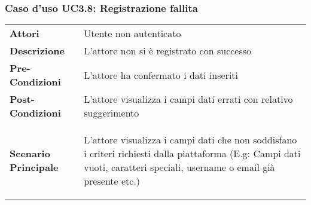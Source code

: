 \subsubsection{Caso d'uso UC3.8:  Registrazione fallita}
\label{UC3_8}

\begin{minipage}{\linewidth}
\begin{longtable}{ l | p{11cm}}
	\hline
	\rowcolor{Gray}
	 \multicolumn{2}{c}{UC3.8 - Registrazione fallita} \\
	 \hline
	\textbf{Attori} & Utente non autenticato \\
	\textbf{Descrizione} & L'attore non si è registrato con successo  \\
	\textbf{Pre-Condizioni} & L'attore ha confermato i dati inseriti \\
	\textbf{Post-Condizioni} & L'attore visualizza i campi dati errati con relativo suggerimento \\
	\textbf{Scenario Principale} & \begin{enumerate*}[label=(\arabic*.),itemjoin={\newline}]
		\item L'attore visualizza i campi dati che non soddisfano i criteri richiesti dalla piattaforma (E.g: Campi dati vuoti, caratteri speciali, username o email già presente etc.)
	\end{enumerate*}\\
\end{longtable}
\end{minipage}